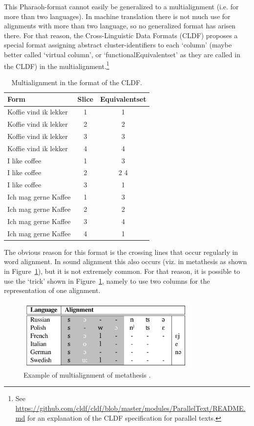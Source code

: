 \documentclass[11pt]{article}
\begin{document}
This Pharaoh-format cannot easily be generalized to a multialignment (i.e. for more than two languages). In machine translation there is not much use for alignments with more than two language, so no generalized format has arisen there. For that reason, the Cross-Linguistic Data Formats (CLDF) proposes a special format assigning  abstract cluster-identifiers to each `column' (maybe better called `virtual column', or `functionalEquivalentset' as they are called in the CLDF) in the multialignment.\footnote{See \url{https://github.com/cldf/cldf/blob/master/modules/ParallelText/README.md} for an explanation of the CLDF specification for parallel texts.}

\begin{table}[htp]
\centering
\begin{tabular}{ l c c }            \hline
 Form & Slice & Equivalentset    \\ \hline
 Koffie vind ik lekker & 1 & 1   \\
 Koffie vind ik lekker & 2 & 2   \\
 Koffie vind ik lekker & 3 & 3   \\
 Koffie vind ik lekker & 4 & 4   \\ \hline
 I like coffee         & 1 & 3   \\
 I like coffee         & 2 & 2 4 \\
 I like coffee         & 3 & 1   \\ \hline
 Ich mag gerne Kaffee  & 1 & 3   \\
 Ich mag gerne Kaffee  & 2 & 2   \\
 Ich mag gerne Kaffee  & 3 & 4   \\
 Ich mag gerne Kaffee  & 4 & 1   \\ \hline
\end{tabular}
\caption{Multialignment in the format of the CLDF.}
\label{tab:cldf_paralleltext}
\end{table}

The obvious reason for this format is the crossing lines that occur regularly in word alignment. In sound alignment this also occurs (viz. in metathesis as shown in Figure~\ref{fig:metathesis_list}), but it is not extremely common. For that reason, it is possible to use the `trick' shown in Figure~\ref{fig:metathesis_list}, namely to use two columns for the representation of one alignment.

\begin{figure}[htbp]
  \centering
  \includegraphics[width=0.8\textwidth]{images/metathesis_list.pdf}
  \caption{Example of multialignment of metathesis \parencite[135]{list2014}.}
  \label{fig:metathesis_list}
\end{figure}
\end{document}
